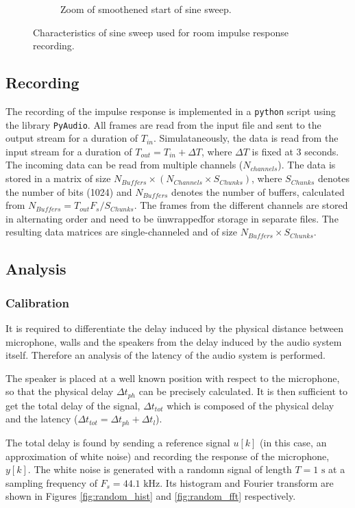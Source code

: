 \begin{figure}[htb]
\begin{subfigure}[b]{0.49\linewidth}
        \caption{Zoom of smoothened start of sine sweep.}
        \label{fig:sweep_start}
	\end{subfigure}
	\caption{Characteristics of sine sweep used for room impulse response recording.} 
	\label{fig:sweep}
\end{figure}

\subsection{Recording}

The recording of the impulse response is implemented in a \texttt{python} script using the library \texttt{PyAudio}. 
All frames are read from the input file and sent to the output stream for a duration of $T_{in}$. 
Simulataneously, the data is read from the input stream for a duration of  $T_{out}=T_{in} + \Delta T$, where $\Delta T$ is fixed at 3 seconds. The incoming data can be read from multiple channels ($N_{channels}$). 
The data is stored in a matrix of size $N_{Buffers} \times (N_{Channels} \times  S_{Chunks})$, where $S_{Chunks}$ denotes the number of bits (1024) and $N_{Buffers}$ denotes the number of buffers, calculated from $N_{Buffers} = T_{out}{F_s}/S_{Chunks}$.
The frames from the different channels are stored in alternating order and need to be \"unwrapped\" for storage in separate files. The resulting data matrices are single-channeled and of size $N_{Buffers} \times  S_{Chunks}$.


\subsection{Analysis}
\label{sec:analysis}
\subsubsection{Calibration}
It is required to differentiate the delay induced by the physical distance between microphone, walls and the speakers from the delay induced by the audio system itself. 
Therefore an analysis of the latency of the audio system is performed. 

The speaker is placed at a well known position with respect to the microphone, so that the physical delay $\Delta t_{ph}$ can be precisely calculated. 
It is then sufficient to get the total delay of the signal, $\Delta t_{tot}$ which is composed of the physical delay and the latency ($\Delta t_{tot}=\Delta t_{ph}+\Delta t_{l}$).

The total delay is found by sending a reference signal $u[k]$ (in this case, an approximation of white noise) and recording the response of the microphone, $y[k]$. 
The white noise is generated with a randomn signal of length $T=1\text{ s}$ at a sampling frequency of $F_s=44.1 \text{ kHz}$. Its histogram and Fourier transform are shown in Figures \ref{fig:random_hist} and \ref{fig:random_fft} respectively. 

